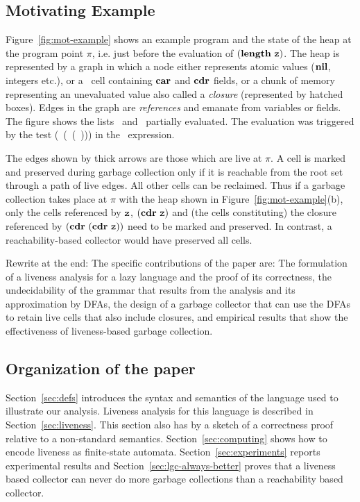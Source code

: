 \documentclass[9pt]{sigplanconf}
\begin{document}
\subsection{Motivating Example}
\label{sec:motiv}

Figure~\ref{fig:mot-example} shows an example program and the state of
the heap at the program point $\pi$, i.e. just before the  evaluation
of $(\length\ \pz)$.  The heap is represented by a graph in which
a node  either represents atomic values ($\mbox{$\mathbf{ nil}$}$,  integers etc.), or
a \CONS\  cell  containing $\mbox{$\mathbf{car}$}$  and  $\mbox{$\mathbf{cdr}$}$  fields, or a chunk of
memory representing an unevaluated
value  also called a  {\em closure}  (represented by  hatched boxes).
Edges in the graph are  {\em references} and emanate from variables or
fields.  The figure shows the lists \px\ and \pz\ partially evaluated.
The evaluation was triggered by the test (\NULLQ~(\CAR~(\CDR~\pz))) in
the \SIF\ expression.


The edges shown by thick arrows  are those which are live at $\pi$.  A
cell is marked and preserved  during garbage collection only if it is
reachable from the  root set through a path of  live edges.  All other
cells can be  reclaimed.  Thus if a garbage  collection takes place at
$\pi$ with the heap shown in Figure~\ref{fig:mot-example}(b), only the
cells referenced by $\mbox{\tt z}$,  $(\mbox{$\mathbf{cdr}$}~ \mbox{\tt z})$ and (the cells constituting)
the closure  referenced by $(\mbox{$\mathbf{cdr}$}~(\mbox{$\mathbf{cdr}$}~\mbox{\tt z}))$  need to be  marked and
preserved.  In  contrast, a  reachability-based  collector would  have
preserved all cells.

{\color {Myblue}Rewrite at the end: The  specific contributions of the
paper
  are: The formulation of a  liveness analysis for a lazy language and
  the proof of its correctness, the undecidability of the grammar that
  results from the analysis and  its approximation by DFAs, the design
  of a  garbage collector that can  use the DFAs to  retain live cells
  that  also include  closures, and  empirical results  that  show the
  effectiveness of liveness-based garbage collection.}

\subsection{Organization of the paper}

Section~\ref{sec:defs} introduces the syntax and semantics of the
language used to illustrate our
analysis.
Liveness analysis for this language is  described in
Section~\ref{sec:liveness}. This section also has by  a  sketch  of  a
correctness proof  relative  to  a  non-standard
semantics.  Section~\ref{sec:computing}  shows how to  encode liveness
as   finite-state  automata.    Section~\ref{sec:experiments}  reports
experimental  results  and Section~\ref{sec:lgc-always-better}  proves
that a liveness based collector  can never do more garbage collections
than a reachability based collector.
\end{document}
